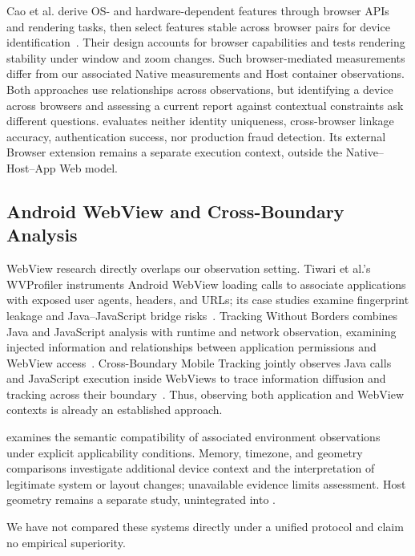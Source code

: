 Cao et al. derive OS- and hardware-dependent features through browser APIs and rendering tasks, then select features stable across browser pairs for device identification~\cite{cao2017crossbrowser}. Their design accounts for browser capabilities and tests rendering stability under window and zoom changes. Such browser-mediated measurements differ from our associated Native measurements and Host container observations. Both approaches use relationships across observations, but identifying a device across browsers and assessing a current report against contextual constraints ask different questions. \hg evaluates neither identity uniqueness, cross-browser linkage accuracy, authentication success, nor production fraud detection. Its external Browser extension remains a separate execution context, outside the Native--Host--App Web model.

\subsection{Android WebView and Cross-Boundary Analysis}
WebView research directly overlaps our observation setting. Tiwari et al.'s WVProfiler instruments Android WebView loading calls to associate applications with exposed user agents, headers, and URLs; its case studies examine fingerprint leakage and Java--JavaScript bridge risks~\cite{tiwari2022webviewfingerprinting}. Tracking Without Borders combines Java and JavaScript analysis with runtime and network observation, examining injected information and relationships between application permissions and WebView access~\cite{weerasekara2025tracking}. Cross-Boundary Mobile Tracking jointly observes Java calls and JavaScript execution inside WebViews to trace information diffusion and tracking across their boundary~\cite{datta2026crossboundary}. Thus, observing both application and WebView contexts is already an established approach.

\hg examines the semantic compatibility of associated environment observations under explicit applicability conditions. Memory, timezone, and geometry comparisons investigate additional device context and the interpretation of legitimate system or layout changes; unavailable evidence limits assessment. Host geometry remains a separate study, unintegrated into \full.

We have not compared these systems directly under a unified protocol and claim no empirical superiority.

